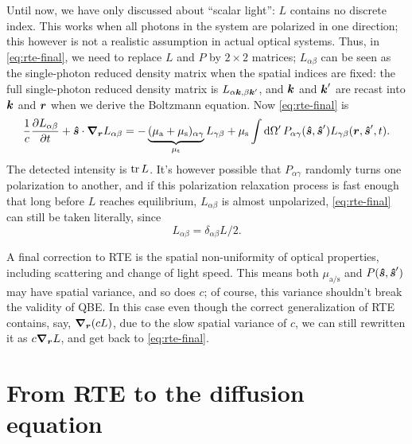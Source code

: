 \documentclass[hyperref, a4paper]{article}
\begin{document}
Until now, we have only discussed about ``scalar light'':
$L$ contains no discrete index.
This works when all photons in the system 
are polarized in one direction; 
this however is not a realistic assumption in actual optical systems.
Thus, in \eqref{eq:rte-final}, 
we need to replace $L$ and $P$ by $2 \times 2$ matrices;
$L_{\alpha \beta}$ can be seen as the single-photon reduced density matrix 
when the spatial indices are fixed:
the full single-photon reduced density matrix is 
$L_{\alpha \vb*{k}, \beta \vb*{k}'}$,
and $\vb*{k}$ and $\vb*{k}'$ are recast into $\vb*{k}$ and $\vb*{r}$ 
when we derive the Boltzmann equation.
Now \eqref{eq:rte-final} is 
\begin{equation}
    \frac{1}{c} \pdv{L_{\alpha \beta}}{t} + \vu*{s} \cdot \grad_{\vb*{r}} L_{\alpha \beta}
    = - \underbrace{(\mu_{\text{a}} + \mu_{\text{s}})_{\alpha \gamma}}_{\mu_{\text{t}}} L_{\gamma \beta} 
    + \mu_{\text{s}} \int \dd{\Omega'} 
    P_{\alpha \gamma}(\vu*{s}, \vu*{s}') L_{\gamma \beta}(\vb*{r}, \vu*{s}', t)  .
\end{equation} 
The detected intensity is $\trace L$.
It's however possible that $P_{\alpha \gamma}$ randomly 
turns one polarization to another, 
and if this polarization relaxation process is fast enough 
that long before $L$ reaches equilibrium, 
$L_{\alpha \beta}$ is almost unpolarized,
\eqref{eq:rte-final} can still be taken literally, 
since 
\begin{equation}
    L_{\alpha \beta} = \delta_{\alpha \beta} L / 2.
\end{equation}

A final correction to RTE is the spatial non-uniformity of optical properties, 
including scattering and change of light speed. 
This means both $\mu_{\text{a/s}}$ and $P(\vu*{s}, \vu*{s}')$ 
may have spatial variance, 
and so does $c$; 
of course, this variance shouldn't break the validity of QBE. 
In this case even though the correct generalization of RTE contains, say, 
$\grad_{\vb*{r}} (c L)$, 
due to the slow spatial variance of $c$, 
we can still rewritten it as $c \grad_{\vb*{r}} L$, 
and get back to \eqref{eq:rte-final}.

\section{From RTE to the diffusion equation}
\end{document}
